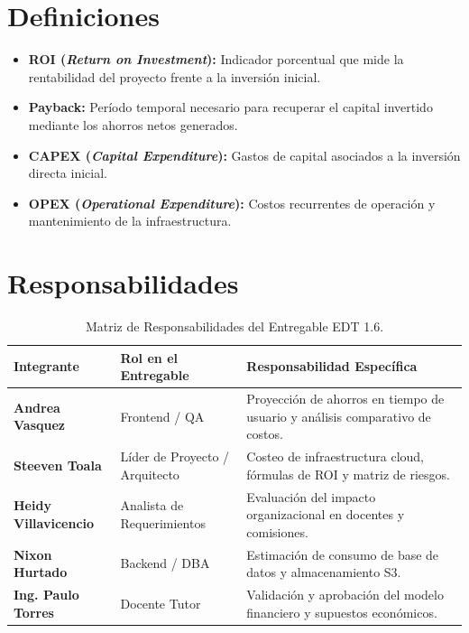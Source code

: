 \documentclass[12pt,a4paper]{article}
\begin{document}
\section{Definiciones}
\begin{itemize}[leftmargin=1.5em, itemsep=2pt]
    \item \textbf{ROI (\textit{Return on Investment}):} Indicador porcentual que mide la rentabilidad del proyecto frente a la inversión inicial.
    \item \textbf{Payback:} Período temporal necesario para recuperar el capital invertido mediante los ahorros netos generados.
    \item \textbf{CAPEX (\textit{Capital Expenditure}):} Gastos de capital asociados a la inversión directa inicial.
    \item \textbf{OPEX (\textit{Operational Expenditure}):} Costos recurrentes de operación y mantenimiento de la infraestructura.
\end{itemize}

\section{Responsabilidades}
\begin{table}[htbp]
\centering
\small
\begin{tabularx}{\textwidth}{|>{\hsize=0.6\hsize\bfseries}X|>{\hsize=0.9\hsize}X|>{\hsize=1.5\hsize}X|}
    \hline
    \rowcolor{tableheader}
    Integrante & Rol en el Entregable & Responsabilidad Específica \\
    \hline
    Andrea Vasquez & Frontend / QA & Proyección de ahorros en tiempo de usuario y análisis comparativo de costos. \\
    \hline
    Steeven Toala & Líder de Proyecto / Arquitecto & Costeo de infraestructura cloud, fórmulas de ROI y matriz de riesgos. \\
    \hline
    Heidy Villavicencio & Analista de Requerimientos & Evaluación del impacto organizacional en docentes y comisiones. \\
    \hline
    Nixon Hurtado & Backend / DBA & Estimación de consumo de base de datos y almacenamiento S3. \\
    \hline
    Ing. Paulo Torres & Docente Tutor & Validación y aprobación del modelo financiero y supuestos económicos. \\
    \hline
\end{tabularx}
\caption{Matriz de Responsabilidades del Entregable EDT 1.6.}
\end{table}
\end{document}
